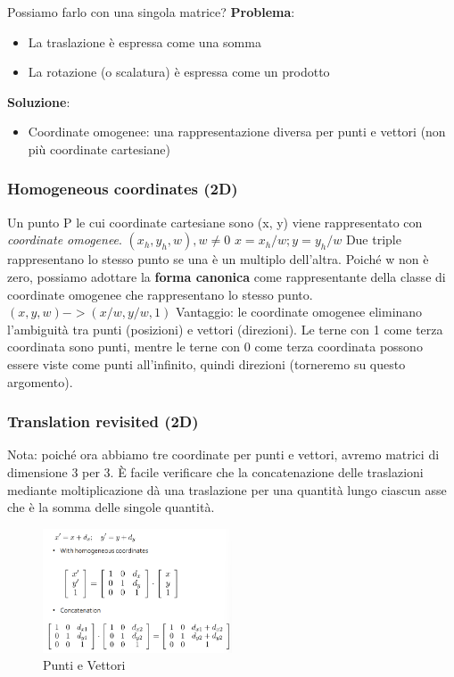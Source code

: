 Possiamo farlo con una singola matrice?
\textbf{Problema}:
\begin{itemize}
\item La traslazione è espressa come una somma
\item La rotazione (o scalatura) è espressa come un prodotto
\end{itemize}

\textbf{Soluzione}:
\begin{itemize}
\item Coordinate omogenee: una rappresentazione diversa per punti e vettori (non più coordinate cartesiane)
\end{itemize}
\subsubsection{Homogeneous coordinates (2D)}
Un punto P le cui coordinate cartesiane sono (x, y) viene rappresentato con \textit{coordinate omogenee}.
$(x_h,y_h,w), w \neq 0  $
$x=x_h/w; y=y_h/w  $
Due triple rappresentano lo stesso punto se una è un multiplo dell'altra.
Poiché w non è zero, possiamo adottare la \textbf{forma canonica} come rappresentante della classe di coordinate omogenee che rappresentano lo stesso punto.
$(x,y,w) -> (x/w,y/w,1)$
Vantaggio: le coordinate omogenee eliminano l'ambiguità tra punti (posizioni) e vettori (direzioni).
Le terne con 1 come terza coordinata sono punti, mentre le terne con 0 come terza coordinata possono essere viste come punti all'infinito, quindi direzioni (torneremo su questo argomento).
\subsubsection{Translation revisited (2D)}
Nota: poiché ora abbiamo tre coordinate per punti e vettori, avremo matrici di dimensione 3 per 3. È facile verificare che la concatenazione delle traslazioni mediante moltiplicazione dà una traslazione per una quantità lungo ciascun asse che è la somma delle singole quantità.
\begin{figure}[H]
    \centering
    \includegraphics[width=0.5\textwidth]{images/CoorddinNonRic.png} 
    \caption{Punti e Vettori}
    \label{fig:immagine}
\end{figure}
